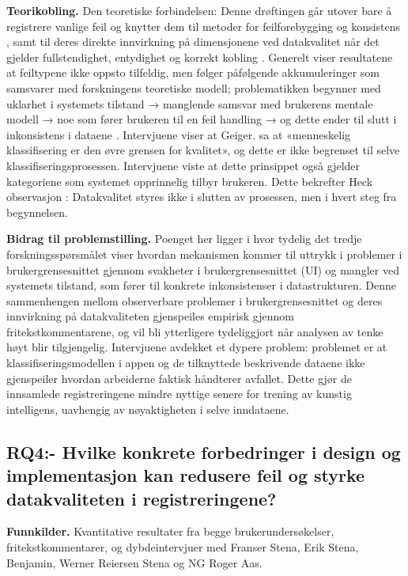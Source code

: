 \textbf{Teorikobling.} Den teoretiske forbindelsen: Denne drøftingen går utover bare å registrere vanlige feil og knytter dem til metoder for feilforebygging og konsistens \cite{nielsen1994}, samt til deres direkte innvirkning på dimensjonene ved datakvalitet når det gjelder fullstendighet, entydighet og korrekt kobling \cite{wang1996}. Generelt viser resultatene at feiltypene ikke oppsto tilfeldig, men følger påfølgende akkumuleringer som samsvarer med forskningens teoretiske modell; problematikken begynner med uklarhet i systemets tilstand → manglende samsvar med brukerens mentale modell → noe som fører brukeren til en feil handling → og dette ender til slutt i inkonsistens i dataene \cite{nielsen1994, norman2013,wang1996}.
Intervjuene viser at Geiger. \cite{geiger2021} sa at «menneskelig klassifisering er den øvre grensen for kvalitet», og dette er ikke begrenset til selve klassifiseringsprosessen. Intervjuene viste at dette prinsippet også gjelder kategoriene som systemet opprinnelig tilbyr brukeren. Dette bekrefter Heck observasjon \cite{heck2025}: Datakvalitet styres ikke i slutten av prosessen, men i hvert steg fra begynnelsen.

\textbf{Bidrag til problemstilling.} Poenget her ligger i hvor tydelig det tredje forskningsspørsmålet viser hvordan mekanismen kommer til uttrykk i problemer i brukergrensesnittet gjennom svakheter i brukergrensesnittet (UI) og mangler ved systemets tilstand, som fører til konkrete inkonsistenser i datastrukturen. Denne sammenhengen mellom observerbare problemer i brukergrensesnittet og deres innvirkning på datakvaliteten gjenspeiles empirisk gjennom fritekstkommentarene, og vil bli ytterligere tydeliggjort når analysen av tenke høyt blir tilgjengelig. Intervjuene avdekket et dypere problem: problemet er at klassifiseringsmodellen i appen og de tilknyttede beskrivende dataene ikke gjenspeiler hvordan arbeiderne faktisk håndterer avfallet. Dette gjør de innsamlede registreringene mindre nyttige senere for trening av kunstig intelligens, uavhengig av nøyaktigheten i selve inndataene.

\subsection{RQ4:- Hvilke konkrete forbedringer i design og implementasjon kan redusere feil og styrke datakvaliteten i registreringene?}

\textbf{Funnkilder.} Kvantitative resultater fra begge brukerundersøkelser, fritekstkommentarer, og dybdeintervjuer med Franser Stena, Erik Stena, Benjamin, Werner Reiersen Stena og NG Roger Aas.

